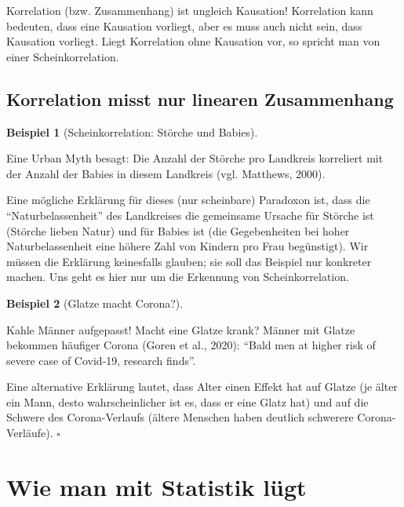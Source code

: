\documentclass[
  letterpaper,
]{scrbook}
\theoremstyle{definition}
\theoremstyle{definition}
\newtheorem{example}{Beispiel}[chapter]
\theoremstyle{definition}
\theoremstyle{remark}
\begin{document}
Korrelation (bzw. Zusammenhang) ist ungleich Kausation! Korrelation kann
bedeuten, dass eine Kausation vorliegt, aber es muss auch nicht sein,
dass Kausation vorliegt. Liegt Korrelation ohne Kausation vor, so
spricht man von einer Scheinkorrelation.

\subsection{Korrelation misst nur linearen
Zusammenhang}\label{korrelation-misst-nur-linearen-zusammenhang}

\begin{example}[Scheinkorrelation: Störche und
Babies]\protect\hypertarget{exm-scheinkorr}{}\label{exm-scheinkorr}

Eine Urban Myth besagt: Die Anzahl der Störche pro Landkreis korreliert
mit der Anzahl der Babies in diesem Landkreis (vgl. Matthews, 2000).

Eine mögliche Erklärung für dieses (nur scheinbare) Paradoxon ist, dass
die \enquote{Naturbelassenheit} des Landkreises die gemeinsame Ursache
für Störche ist (Störche lieben Natur) und für Babies ist (die
Gegebenheiten bei hoher Naturbelassenheit eine höhere Zahl von Kindern
pro Frau begünstigt). Wir müssen die Erklärung keinesfalls glauben; sie
soll das Beispiel nur konkreter machen. Uns geht es hier nur um die
Erkennung von Scheinkorrelation.

\end{example}

\begin{example}[Glatze macht
Corona?]\protect\hypertarget{exm-corona-glatze}{}\label{exm-corona-glatze}

Kahle Männer aufgepasst! Macht eine Glatze krank? Männer mit Glatze
bekommen häufiger Corona (Goren et al., 2020): \enquote{Bald men at
higher risk of severe case of Covid-19, research finds}.

Eine alternative Erklärung lautet, dass Alter einen Effekt hat auf
Glatze (je älter ein Mann, desto wahrscheinlicher ist es, dass er eine
Glatz hat) und auf die Schwere des Corona-Verlaufs (ältere Menschen
haben deutlich schwerere Corona-Verläufe). \(\square\)

\end{example}

\section{Wie man mit Statistik
lügt}\label{wie-man-mit-statistik-luxfcgt-3}
\end{document}
